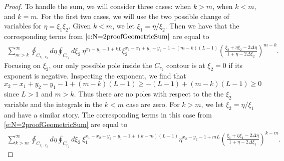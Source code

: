 \documentclass[a4paper,11pt]{article}
\theoremstyle{definition}
\begin{document}
\begin{proof}
To handle the sum, we will consider three cases: when $k>m$, when $k<m$, and $k=m$. For the first two cases, we will use the two possible change of variables for $\eta=\xi_1\xi_2$. Given $k<m$, we let $\xi_1=\eta/\xi_2$. Then we have that the corresponding terms from $\eqref{e:N=2proofGeometricSum}$ are equal to 
\begin{equation}
    \begin{split}
        \sum_{m>k}^\infty\oint_{C_{r_1\cdot r_2}}d\eta\oint_{C_{r_2}}d\xi_2 \ \eta^{x_1-y_1-1+kL}\xi_2^{x_2-x_1+y_1-y_2-1+(m-k)(L-1)}\left( \frac{\xi_2+\eta\xi_2-2\Delta\eta}{1+\eta-2\Delta\xi_2} \right)^{m-k}.
    \end{split}
\end{equation}
Focusing on $\xi_2$, our only possible pole inside the $C_{r_2}$ contour is at $\xi_2=0$ if its exponent is negative. Inspecting the exponent, we find that 
\begin{equation}
    x_2-x_1+y_2-y_1-1+(m-k)(L-1)\geq -(L-1)+(m-k)(L-1)\geq 0
\end{equation}
since $L>1$ and $m>k$. Thus there are no poles with respect to the the $\xi_2$ variable and the integrals in the $k<m$ case are zero. For $k>m$, we let $\xi_2=\eta/\xi_1$ and have a similar story. The corresponding terms in this case from \eqref{e:N=2proofGeometricSum} are equal to 
\begin{equation}
    \begin{split}
        \sum_{k>m}^\infty\oint_{C_{r_1\cdot r_2}}d\eta\oint_{C_{r_2}}d\xi_2 \ \xi_1^{x_1-x_2+y_2-y_1-1+(k-m)(L-1)}\eta^{x_2-y_2-1+mL}\left( \frac{\xi_1+\eta\xi_1-2\Delta\eta}{1+\eta-2\Delta\xi_1} \right)^{k-m}.
    \end{split}
\end{equation}


\end{proof}
\end{document}
